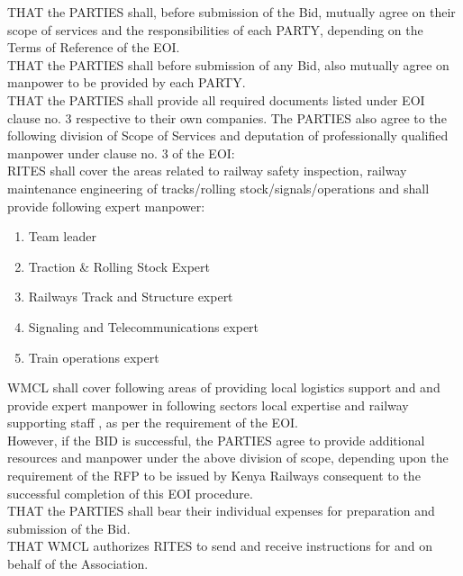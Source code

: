THAT the PARTIES shall, before submission of the Bid, mutually agree on their scope of services and the responsibilities of each PARTY, depending on the Terms of Reference of the EOI.\\

THAT the PARTIES shall before submission of any Bid, also mutually agree on manpower to be provided by each PARTY.\\

THAT the PARTIES shall provide all required documents listed under EOI clause no. 3 respective to their own companies. The PARTIES also agree to the following division of Scope of Services and deputation of professionally qualified manpower under clause no. 3 of the EOI:\\

RITES shall cover the areas related to railway safety inspection, railway maintenance engineering of tracks/rolling stock/signals/operations and shall provide following expert manpower: \\

\begin{enumerate}
	\item Team leader
	\item Traction \& Rolling Stock Expert
	\item Railways Track and Structure expert
	\item Signaling and Telecommunications expert
	\item Train operations expert
\end{enumerate}


WMCL shall cover following areas of providing local logistics support and   and provide expert manpower in following sectors local expertise and railway supporting staff , as per the requirement of the EOI.\\

However, if the BID is successful, the PARTIES agree to provide additional resources and manpower under the above division of scope, depending upon the requirement of the RFP to be issued by Kenya Railways consequent to the successful completion of this EOI procedure.\\

THAT the PARTIES shall bear their individual expenses for preparation and submission of the Bid.\\

THAT WMCL authorizes RITES to send and receive instructions for and on behalf of the Association.\\

